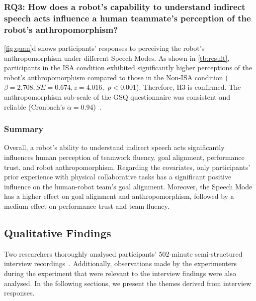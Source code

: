 \subsubsection{RQ3: How does a robot's capability to understand indirect speech acts influence a human teammate's perception of the robot's anthropomorphism?}

\autoref{fig:quan}d shows participants' responses to perceiving the robot's anthropomorphism under different Speech Modes. 
As shown in \autoref{tb:result}, participants in the ISA condition exhibited significantly higher perceptions of the robot's anthropomorphism compared to those in the Non-ISA condition ($\beta = 2.708, SE = 0.674, z = 4.016,$ $p < 0.001$).  Therefore, H3 is confirmed. The anthropomorphism sub-scale of the GSQ questionnaire was consistent and reliable (Cronbach's $\alpha = 0.94$)~\cite{laban2019working}.

\subsubsection{Summary}

Overall, a robot's ability to understand indirect speech acts significantly influences human perception of teamwork fluency, goal alignment, performance trust, and robot anthropomorphism. Regarding the covariates, only participants' prior experience with physical collaborative tasks has a significant positive influence on the human-robot team's goal alignment. Moreover, the Speech Mode has a higher effect on goal alignment and anthropomorphism, followed by a medium effect on performance trust and team fluency.

\subsection{Qualitative Findings}
Two researchers thoroughly analysed participants' 502-minute semi-structured interview recordings~\cite{braun2012thematic}. Additionally, observations made by the experimenters during the experiment that were relevant to the interview findings were also analysed. In the following sections, we present the themes derived from interview responses.

